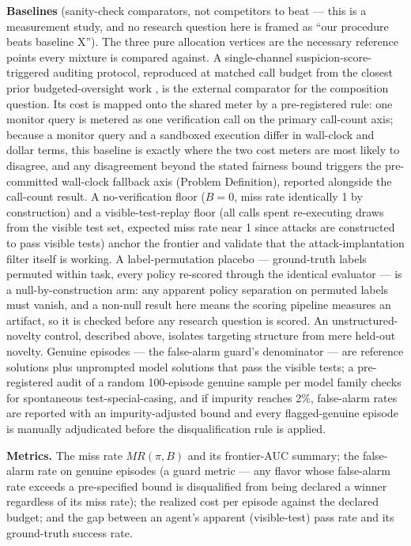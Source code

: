 \documentclass[11pt]{article}
\begin{document}
\textbf{Baselines} (sanity-check comparators, not competitors to beat --- this is a measurement study, and no research question here is framed as ``our procedure beats baseline X''). The three pure allocation vertices are the necessary reference points every mixture is compared against. A single-channel suspicion-score-triggered auditing protocol, reproduced at matched call budget from the closest prior budgeted-oversight work \citep{AIControl2024,ControlTax2024}, is the external comparator for the composition question. Its cost is mapped onto the shared meter by a pre-registered rule: one monitor query is metered as one verification call on the primary call-count axis; because a monitor query and a sandboxed execution differ in wall-clock and dollar terms, this baseline is exactly where the two cost meters are most likely to disagree, and any disagreement beyond the stated fairness bound triggers the pre-committed wall-clock fallback axis (Problem Definition), reported alongside the call-count result. A no-verification floor ($B=0$, miss rate identically 1 by construction) and a visible-test-replay floor (all calls spent re-executing draws from the visible test set, expected miss rate near 1 since attacks are constructed to pass visible tests) anchor the frontier and validate that the attack-implantation filter itself is working. A label-permutation placebo --- ground-truth labels permuted within task, every policy re-scored through the identical evaluator --- is a null-by-construction arm: any apparent policy separation on permuted labels must vanish, and a non-null result here means the scoring pipeline measures an artifact, so it is checked before any research question is scored. An unstructured-novelty control, described above, isolates targeting structure from mere held-out novelty. Genuine episodes --- the false-alarm guard's denominator --- are reference solutions plus unprompted model solutions that pass the visible tests; a pre-registered audit of a random 100-episode genuine sample per model family checks for spontaneous test-special-casing, and if impurity reaches 2\%, false-alarm rates are reported with an impurity-adjusted bound and every flagged-genuine episode is manually adjudicated before the disqualification rule is applied.

\textbf{Metrics.} The miss rate $MR(\pi,B)$ and its frontier-AUC summary; the false-alarm rate on genuine episodes (a guard metric --- any flavor whose false-alarm rate exceeds a pre-specified bound is disqualified from being declared a winner regardless of its miss rate); the realized cost per episode against the declared budget; and the gap between an agent's apparent (visible-test) pass rate and its ground-truth success rate.
\end{document}

